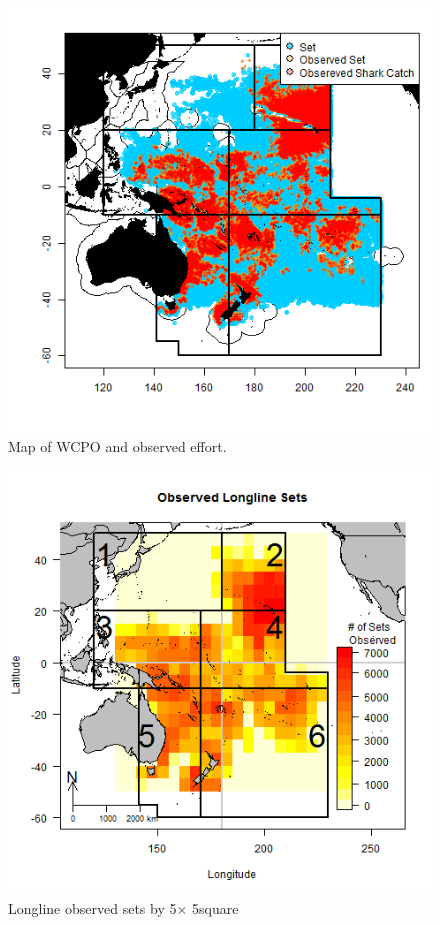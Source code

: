 \documentclass[12pt]{SCreport}
\begin{document}
\begin{figure}
\begin{center}
\includegraphics[scale=0.95]{../GRAPHICS/Defined/FIG_02_MAP_sets}
\caption{\label{fig:fig02} Map of WCPO and observed effort.}
\end{center}
\end{figure}

\begin{figure}
\begin{center}
\includegraphics[scale=0.95]{../GRAPHICS/Defined/FIG_03_obs_ll_sets}
\caption{\label{fig:fig03} Longline observed sets by 5\degree $\times$ 5\degree square}
\end{center}
\end{figure}
\end{document}
